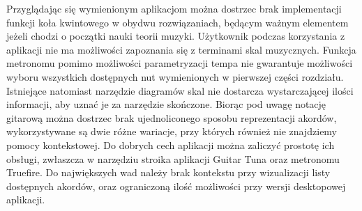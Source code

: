 Przyglądając się wymienionym aplikacjom można dostrzec brak implementacji funkcji koła kwintowego w obydwu rozwiązaniach, będącym ważnym elementem jeżeli chodzi o początki nauki teorii muzyki. Użytkownik podczas korzystania z aplikacji nie ma możliwości zapoznania się z terminami skal muzycznych. Funkcja metronomu pomimo możliwości parametryzacji tempa nie gwarantuje możliwości wyboru wszystkich dostępnych nut wymienionych w pierwszej części rozdziału. Istniejące natomiast narzędzie diagramów skal nie dostarcza wystarczającej ilości informacji, aby uznać je za narzędzie skończone. Biorąc pod uwagę notację gitarową można dostrzec brak ujednoliconego sposobu reprezentacji akordów, wykorzystywane są dwie różne wariacje, przy których również nie znajdziemy pomocy kontekstowej. Do dobrych cech aplikacji można zaliczyć prostotę ich obsługi, zwłaszcza w narzędziu stroika aplikacji Guitar Tuna oraz metronomu Truefire. Do największych wad należy brak kontekstu przy wizualizacji listy dostępnych akordów, oraz ograniczoną ilość możliwości przy wersji desktopowej aplikacji.


